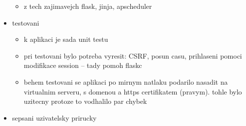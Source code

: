 \begin{itemize}
\begin{itemize}
        \item z tech zajimavejch flask, jinja, apscheduler
    \end{itemize}
    \item testovani
    \begin{itemize}
        \item k aplikaci je sada unit testu
        \item pri testovani bylo potreba vyresit: CSRF, posun casu, prihlaseni pomoci modifikace session -- tady pomoh flaskc
        \item behem testovani se aplikaci po mirnym natlaku podarilo nasadit na virtualnim serveru, s domenou a https certifikatem (pravym). tohle bylo uzitecny protoze to vodhalilo par chybek
    \end{itemize}
    \item sepsani uzivatelsky prirucky
\end{itemize}